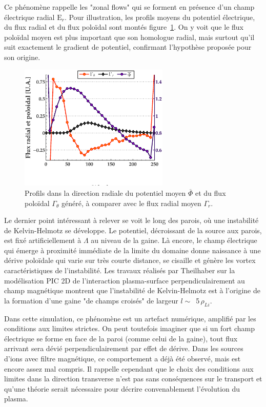 \begin{refsection}
Ce phénomène rappelle les "zonal flows" qui se forment en présence
d'un champ électrique radial $\text{E}_r$. Pour illustration, les profils moyens du
potentiel électrique, du flux radial et du flux poloïdal sont montés
figure~\ref{2-profileFluxRadialWhTedNdx}. On y voit que le flux poloïdal moyen
est plus important que son homologue radial, mais surtout qu'il suit exactement
le gradient de potentiel, confirmant l'hypothèse proposée pour son origine.

	\begin{figure}[!htbp]
    \centering
    \includegraphics[height=6cm]{figures/2-profileFluxWhTedNdx.eps}
    \caption{Profils dans la direction radiale du potentiel moyen
    $\overline{\Phi}$ et du flux poloïdal $\Gamma_\theta$ généré, à comparer
    avec le flux radial moyen $\Gamma_r$.\label{2-profileFluxRadialWhTedNdx}}
	\end{figure}

Le dernier point intéressant à relever se voit le long des parois, où une
instabilité de Kelvin-Helmotz se développe. Le potentiel, décroissant de la
source aux parois, est fixé artificiellement à $\Lambda$ au niveau de la gaine.
Là encore, le champ électrique qui émerge à proximité immédiate de la limite du
domaine donne naissance à une dérive poloïdale qui varie sur très courte
distance, se cisaille et génère les vortex caractéristiques de l'instabilité.
Les travaux réalisés par Theilhaber sur la modélisation PIC 2D de l'interaction
plasma-surface perpendiculairement au champ magnétique
\parencite{Theilhaber} montrent que l'instabilité de Kelvin-Helmotz est à
l'origine de la formation d'une gaine "de champs croisés" de largeur $l\sim\,$
5$\,\rho_{Li}$.

Dans cette simulation, ce phénomène est un artefact numérique, amplifié par les
conditions aux limites strictes. On peut toutefois imaginer que si un fort
champ électrique se forme en face de la paroi (comme celui de la gaine), tout
flux arrivant sera dévié perpendiculairement par effet de dérive.
Dans les sources d'ions avec filtre magnétique, ce comportement a déjà été
observé, mais est encore assez mal compris. Il rappelle cependant que le choix
des conditions aux limites dans la direction transverse n'est pas sans
conséquences sur le transport et qu'une théorie serait nécessaire pour décrire
convenablement l'évolution du plasma.


\end{refsection}
